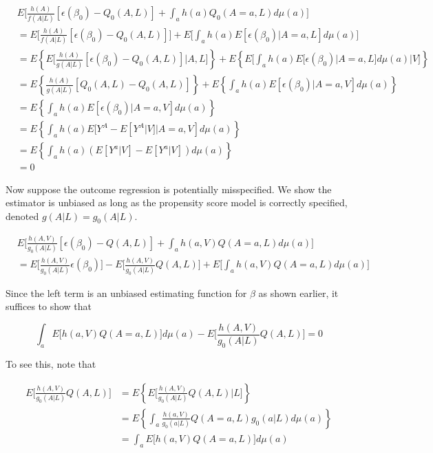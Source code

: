 \documentclass[12pt]{article}
\begin{document}
\begin{align*}
&E \bigg[\frac{h(A)}{f(A | L)}[\epsilon(\beta_{0}) - Q_{0}(A, L)] + \int_{a} h(a)Q_{0}(A = a, L)d\mu (a) \bigg] \\
&= E \bigg[\frac{h(A)}{f(A | L)}[\epsilon(\beta_{0}) - Q_{0}(A, L)] \bigg] + E \bigg[\int_{a} h(a)E[\epsilon(\beta_{0}) | A = a, L]d\mu (a) \bigg] \\
&= E \left \{ E \bigg[\frac{h(A)}{g(A | L)}[\epsilon(\beta_{0}) - Q_{0}(A, L)] | A, L \bigg] \right \} + E \left \{ E \bigg[\int_{a} h(a)E[\epsilon(\beta_{0}) | A = a, L]d\mu (a) | V \bigg] \right \} \\
&= E \left \{ \frac{h(A)}{g(A | L)}[Q_{0}(A, L) - Q_{0}(A, L)] \right \} + E \left \{ \int_{a} h(a)E[\epsilon(\beta_{0}) | A = a, V]d\mu (a) \right \} \\
&= E \left \{ \int_{a} h(a)E[\epsilon(\beta_{0}) | A = a, V]d\mu (a) \right \} \\
&= E \left \{ \int_{a} h(a)E[Y^{A} - E[Y^{A} | V] | A = a, V]d\mu (a) \right \} \\
&= E \left \{ \int_{a} h(a)(E[Y^{a} | V] - E[Y^{a} |V])d\mu (a) \right \} \\
&= 0
\end{align*}


Now suppose the outcome regression is potentially misspecified. We show the estimator is unbiased as long as the propensity score model is correctly specified, denoted $g(A|L) = g_{0}(A|L)$.

\begin{align*}
&E \bigg[\frac{h(A, V)}{g_{0}(A | L)}[\epsilon(\beta_{0}) - Q(A, L)] + \int_{a} h(a, V)Q(A = a, L)d\mu (a) \bigg] \\
&= E \bigg[\frac{h(A, V)}{g_{0}(A | L)}\epsilon(\beta_{0}) \bigg] - E \bigg[\frac{h(A, V)}{g_{0}(A | L)}Q(A, L) \bigg] + E \bigg[ \int_{a} h(a, V)Q(A = a, L)d\mu (a) \bigg]
\end{align*}

Since the left term is an unbiased estimating function for $\beta$ as shown earlier, it suffices to show that

\begin{equation*}
\int_{a} E \bigg[ h(a, V)Q(A = a, L) \bigg] d\mu (a) - E \bigg[\frac{h(A, V)}{g_{0}(A | L)}Q(A, L) \bigg] = 0
\end{equation*}

To see this, note that

\begin{align*}
E \bigg[\frac{h(A, V)}{g_{0}(A | L)}Q(A, L) \bigg] &= E \left \{ E \bigg[\frac{h(A, V)}{g_{0}(A | L)}Q(A, L) | L \bigg] \right \} \\
&= E \left \{ \int_{a} \frac{h(a, V)}{g_{0}(a | L)}Q(A = a, L) g_{0}(a | L) d\mu (a) \right \} \\
&= \int_{a} E \bigg[ h(a, V)Q(A = a, L) \bigg] d\mu (a)
\end{align*}
\end{document}
